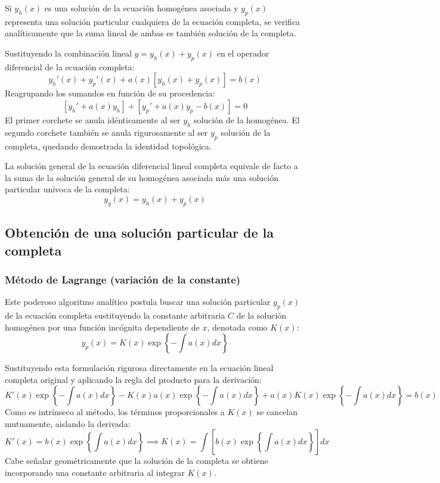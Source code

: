 \begin{lema}
Si $y_h(x)$ es una solución de la ecuación homogénea asociada y $y_p(x)$ representa una solución particular cualquiera de la ecuación completa, se verifica analíticamente que la suma lineal de ambas es también solución de la completa.
\end{lema}

\begin{demostracion}
Sustituyendo la combinación lineal $y = y_h(x) + y_p(x)$ en el operador diferencial de la ecuación completa:
$$ y_h'(x) + y_p'(x) + a(x)[y_h(x) + y_p(x)] = b(x) $$
Reagrupando los sumandos en función de su procedencia:
$$ [y_h' + a(x)y_h] + [y_p' + a(x)y_p - b(x)] = 0 $$
El primer corchete se anula idénticamente al ser $y_h$ solución de la homogénea. El segundo corchete también se anula rigurosamente al ser $y_p$ solución de la completa, quedando demostrada la identidad topológica.
\end{demostracion}

\begin{corolario}
La solución general de la ecuación diferencial lineal completa equivale de facto a la suma de la solución general de su homogénea asociada más una solución particular unívoca de la completa:
$$ y_g(x) = y_h(x) + y_p(x) $$
\end{corolario}

\subsection{Obtención de una solución particular de la completa}

\subsubsection{Método de Lagrange (variación de la constante)}

Este poderoso algoritmo analítico postula buscar una solución particular $y_p(x)$ de la ecuación completa sustituyendo la constante arbitraria $C$ de la solución homogénea por una función incógnita dependiente de $x$, denotada como $K(x)$:
$$ y_p(x) = K(x) \exp\left\{ -\int a(x)dx \right\} $$

Sustituyendo esta formulación rigurosa directamente en la ecuación lineal completa original y aplicando la regla del producto para la derivación:
$$ K'(x)\exp\left\{ -\int a(x)dx \right\} - K(x)a(x)\exp\left\{ -\int a(x)dx \right\} + a(x)K(x)\exp\left\{ -\int a(x)dx \right\} = b(x) $$
Como es intrínseco al método, los términos proporcionales a $K(x)$ se cancelan mutuamente, aislando la derivada:
$$ K'(x) = b(x) \exp\left\{ \int a(x)dx \right\} \implies K(x) = \int \left[ b(x) \exp\left\{ \int a(x)dx \right\} \right] dx $$
Cabe señalar geométricamente que la solución de la completa se obtiene incorporando una constante arbitraria al integrar $K(x)$.

